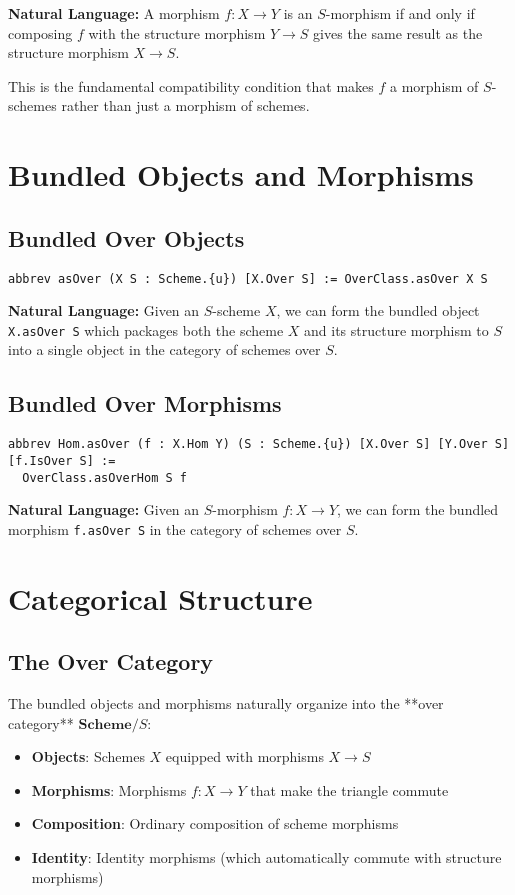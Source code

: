 \documentclass{article}
\theoremstyle{definition}
\begin{document}
\textbf{Natural Language:} A morphism $f: X \to Y$ is an $S$-morphism if and only if composing $f$ with the structure morphism $Y \to S$ gives the same result as the structure morphism $X \to S$.

This is the fundamental compatibility condition that makes $f$ a morphism of $S$-schemes rather than just a morphism of schemes.

\section{Bundled Objects and Morphisms}

\subsection{Bundled Over Objects}

\begin{lstlisting}
abbrev asOver (X S : Scheme.{u}) [X.Over S] := OverClass.asOver X S
\end{lstlisting}

\textbf{Natural Language:} Given an $S$-scheme $X$, we can form the bundled object \texttt{X.asOver S} which packages both the scheme $X$ and its structure morphism to $S$ into a single object in the category of schemes over $S$.

\subsection{Bundled Over Morphisms}

\begin{lstlisting}
abbrev Hom.asOver (f : X.Hom Y) (S : Scheme.{u}) [X.Over S] [Y.Over S] [f.IsOver S] :=
  OverClass.asOverHom S f
\end{lstlisting}

\textbf{Natural Language:} Given an $S$-morphism $f: X \to Y$, we can form the bundled morphism \texttt{f.asOver S} in the category of schemes over $S$.

\section{Categorical Structure}

\subsection{The Over Category}

The bundled objects and morphisms naturally organize into the **over category** $\mathbf{Scheme}/S$:
\begin{itemize}
\item \textbf{Objects}: Schemes $X$ equipped with morphisms $X \to S$
\item \textbf{Morphisms}: Morphisms $f: X \to Y$ that make the triangle commute
\item \textbf{Composition}: Ordinary composition of scheme morphisms
\item \textbf{Identity}: Identity morphisms (which automatically commute with structure morphisms)
\end{itemize}
\end{document}
